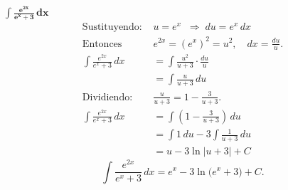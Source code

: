 $\displaystyle \mathbf{\int \frac{e^{2x}}{e^{x} + 3}\,dx}$
\nopagebreak
\begin{align*}
\text{Sustituyendo: } &u = e^{x} \;\;\Rightarrow\; du = e^{x}\,dx \\[6pt]
\text{Entonces } &e^{2x} = (e^{x})^{2} = u^{2}, \quad dx = \frac{du}{u}. \\[6pt]
\int \frac{e^{2x}}{e^{x} + 3}\,dx
&= \int \frac{u^{2}}{u + 3}\cdot \frac{du}{u} \\[6pt]
&= \int \frac{u}{u + 3}\,du \\[6pt]
\text{Dividiendo: } &\frac{u}{u + 3} = 1 - \frac{3}{u + 3}. \\[6pt]
\int \frac{e^{2x}}{e^{x} + 3}\,dx
&= \int \left(1 - \frac{3}{u + 3}\right)\,du \\[6pt]
&= \int 1\,du - 3\int \frac{1}{u + 3}\,du \\[6pt]
&= u - 3\ln|u + 3| + C
\end{align*}
\[
\boxed{\displaystyle 
\int \frac{e^{2x}}{e^{x} + 3}\,dx
= e^{x} - 3\ln\bigl(e^{x} + 3\bigr) + C.}
\]
